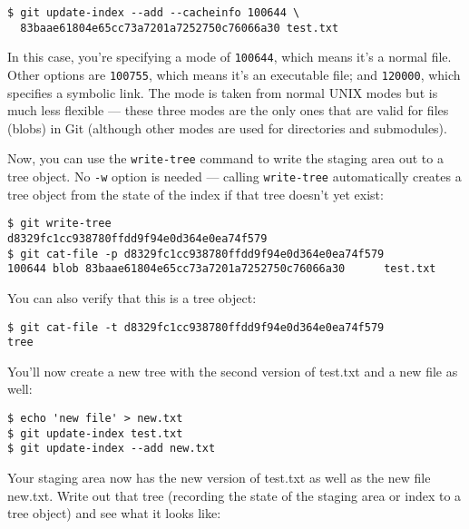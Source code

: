 \documentclass[a4paper]{book}
\newcounter{tab}[chapter]
\begin{document}
\begin{shaded}\begin{verbatim}
$ git update-index --add --cacheinfo 100644 \
  83baae61804e65cc73a7201a7252750c76066a30 test.txt
\end{verbatim}\end{shaded}

In this case, you're specifying a mode of \texttt{100644}, which means it's a normal file. Other options are \texttt{100755}, which means it's an executable file; and \texttt{120000}, which specifies a symbolic link. The mode is taken from normal UNIX modes but is much less flexible --- these three modes are the only ones that are valid for files (blobs) in Git (although other modes are used for directories and submodules).

Now, you can use the \texttt{write-tree} command to write the staging area out to a tree object. No \texttt{-w} option is needed --- calling \texttt{write-tree} automatically creates a tree object from the state of the index if that tree doesn't yet exist:

\begin{shaded}\begin{verbatim}
$ git write-tree
d8329fc1cc938780ffdd9f94e0d364e0ea74f579
$ git cat-file -p d8329fc1cc938780ffdd9f94e0d364e0ea74f579
100644 blob 83baae61804e65cc73a7201a7252750c76066a30      test.txt
\end{verbatim}\end{shaded}

You can also verify that this is a tree object:

\begin{shaded}\begin{verbatim}
$ git cat-file -t d8329fc1cc938780ffdd9f94e0d364e0ea74f579
tree
\end{verbatim}\end{shaded}

You'll now create a new tree with the second version of test.txt and a new file as well:

\begin{shaded}\begin{verbatim}
$ echo 'new file' > new.txt
$ git update-index test.txt
$ git update-index --add new.txt
\end{verbatim}\end{shaded}

Your staging area now has the new version of test.txt as well as the new file new.txt. Write out that tree (recording the state of the staging area or index to a tree object) and see what it looks like:
\end{document}
